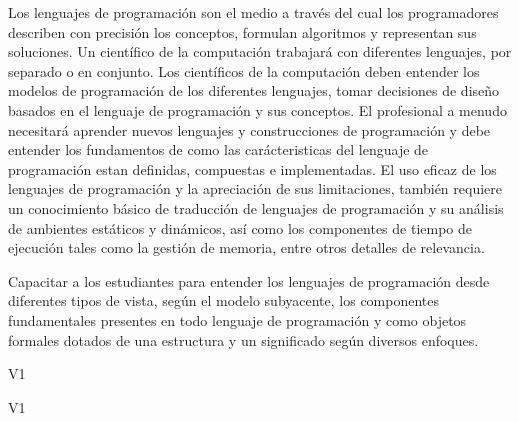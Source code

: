 \begin{syllabus}


\begin{justification}
Los lenguajes de programación son el medio a través del cual los programadores describen con precisión los conceptos, 
formulan algoritmos y representan sus soluciones. Un científico de la computación trabajará con diferentes lenguajes, 
por separado o en conjunto. Los científicos de la computación deben entender los modelos de programación de los diferentes 
lenguajes, tomar decisiones de diseño basados en el lenguaje de programación y sus conceptos. El profesional a menudo 
necesitará aprender nuevos lenguajes y construcciones de programación y debe entender los fundamentos de como las 
carácteristicas del lenguaje de programación estan definidas, compuestas e implementadas. El uso eficaz de los lenguajes 
de programación y la apreciación de sus limitaciones, también requiere un conocimiento básico de traducción de lenguajes 
de programación y su análisis de ambientes estáticos y dinámicos, así como los componentes de tiempo de ejecución tales 
como la gestión de memoria, entre otros detalles de relevancia.
\end{justification}

\begin{goals}
\item Capacitar a los estudiantes para entender los lenguajes de programación desde diferentes tipos de vista, según el 
modelo subyacente, los componentes fundamentales presentes en todo lenguaje de programación y como objetos formales 
dotados de una estructura y un significado según diversos enfoques.
\end{goals}

\begin{outcomes}{V1}
    \item {}
    \item {}
    \item {} 
    \item {} 		
\end{outcomes}

\begin{competences}{V1}
    \item {} 
    \item {}
    \item {}
    \item {}
    \item {}
\end{competences}


\end{syllabus}
